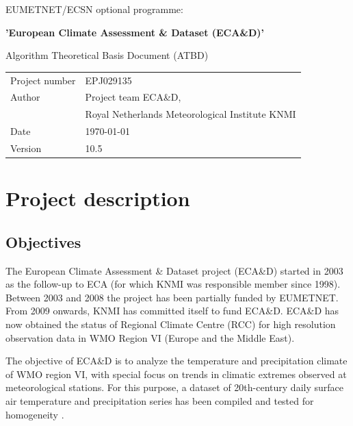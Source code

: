 \documentclass[a4paper,11pt]{article}
\begin{document}
\vspace{2cm}
\pagestyle{empty}

{\Large{EUMETNET/ECSN optional programme:}}
\vspace{1cm}

{\Large{\textbf{'European Climate Assessment \& Dataset (ECA\&D)'}}}
\vspace{1cm}

{\Large{Algorithm Theoretical Basis Document (ATBD)}}
\vspace{10cm}

\begin{tabular}{l@{: }l}
Project number & EPJ029135\\
Author & Project team ECA\&D,\\
& Royal Netherlands Meteorological Institute KNMI\\
Date & \today \\
Version & 10.5\\
\end{tabular}

\newpage
{}
\pagestyle{plain}

\tableofcontents

\newpage

\section{Project description}

\subsection{Objectives}
\label{sec:obj}

The European Climate Assessment \& Dataset project (ECA\&D) started in
2003 as the follow-up to ECA (for which KNMI was responsible member
since 1998). Between 2003 and 2008 the project has been partially
funded by EUMETNET. From 2009 onwards, KNMI has committed itself to
fund ECA\&D.
ECA\&D has now obtained the status of Regional Climate Centre (RCC)
for high resolution observation data in WMO Region VI (Europe and
the Middle East). 

The objective of ECA\&D is to analyze the temperature and
precipitation climate of WMO region VI, with special focus on trends
in climatic extremes observed at meteorological stations. For this
purpose, a dataset of 20th-century daily surface air temperature and
precipitation series has been compiled \citep{kleintank2002} and
tested for homogeneity \citep{wijngaard}.
\end{document}
